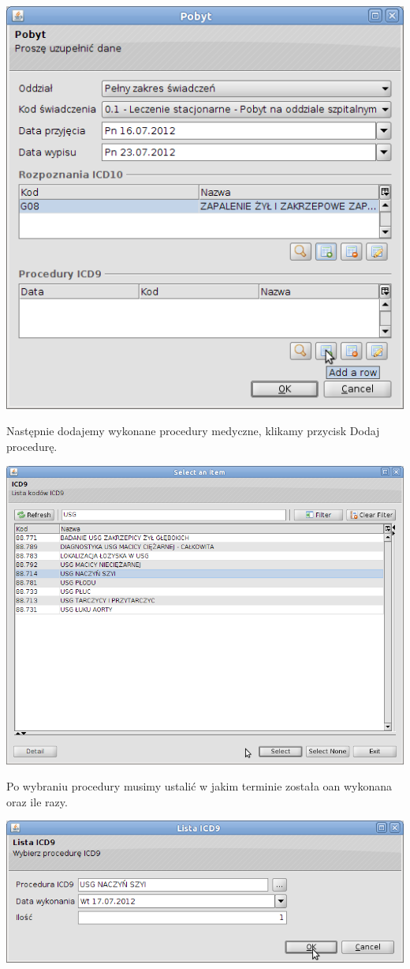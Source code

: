 \includegraphics[scale=0.4]{images/gruper4}

Następnie dodajemy wykonane procedury medyczne, klikamy przycisk Dodaj procedurę.

\includegraphics[scale=0.4]{images/gruper5}

Po wybraniu procedury musimy ustalić w jakim terminie została oan wykonana oraz ile razy.

\includegraphics[scale=0.4]{images/gruper6}

